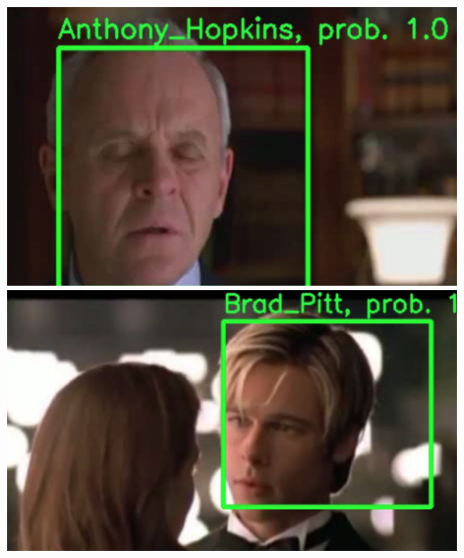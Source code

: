 \documentclass{article}
\begin{document}
\includegraphics[scale=0.2]{images/demo4.png}\\  
\includegraphics[scale=0.2]{images/demo5.png}  \\
\end{document}
